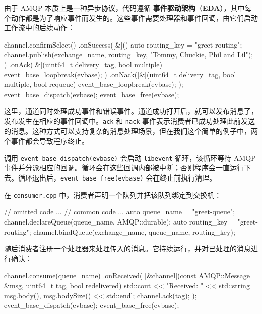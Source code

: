 \label{idx:1564}
\label{idx:1565}
\label{idx:1566}
\label{idx:1567}
由于 AMQP 本质上是一种异步协议，代码遵循 \textbf{事件驱动架构}（\textbf{EDA}），其中每个动作都是为了响应事件而发生的。这些事件需要处理器和事件回调，由它们启动工作流中的后续动作：

\begin{codebox}[text]
channel.confirmSelect()
    .onSuccess([&]() {
      auto routing_key = "greet-routing";
      channel.publish(exchange_name, routing_key,
                      "Tommy, Chuckie, Phil and Lil");
    })
    .onAck([&](uint64_t delivery_tag, bool multiple) {
      event_base_loopbreak(evbase);
    })
    .onNack([&](uint64_t delivery_tag, bool multiple, bool requeue) {
      event_base_loopbreak(evbase);
    });
event_base_dispatch(evbase);
event_base_free(evbase);
\end{codebox}

这里，通道同时处理成功事件和错误事件。通道成功打开后，就可以发布消息了，发布发生在相应的事件回调中。\texttt{ack} 和 \texttt{nack} 事件表示消费者已成功处理此前发送的消息。这种方式可以支持复杂的消息处理场景，但在我们这个简单的例子中，两个事件都会导致程序终止。

调用 \texttt{event\_\allowbreak{}base\_\allowbreak{}dispatch(\allowbreak{}evbase)\allowbreak{}} 会启动 \texttt{libevent} 循环，该循环等待 AMQP 事件并分派相应的回调。循环会在这些回调内部被中断；否则程序会一直运行下去。循环退出后，\texttt{event\_\allowbreak{}base\_\allowbreak{}free(\allowbreak{}evbase)\allowbreak{}} 会在终止前执行清理。

在 \texttt{consumer.\allowbreak{}cpp} 中，消费者声明一个队列并把该队列绑定到交换机：

\begin{codebox}[text]
// omitted code
...
// common code
...
auto queue_name = "greet-queue";
channel.declareQueue(queue_name, AMQP::durable);
auto routing_key = "greet-routing";
channel.bindQueue(exchange_name, queue_name, routing_key);
\end{codebox}

\label{idx:1568}
\label{idx:1569}
\label{idx:1570}
随后消费者注册一个处理器来处理传入的消息。它持续运行，并对已处理的消息进行确认：

\begin{codebox}[cpp]
channel.consume(queue_name)
    .onReceived(
        [&channel](const AMQP::Message &msg, uint64_t tag, bool 
                   redelivered) {
                                std::cout << "Received: " << std::string{
                                msg.body(), msg.bodySize()
                                }
                   << std::endl;
         channel.ack(tag);
        });
event_base_dispatch(evbase);
event_base_free(evbase);
\end{codebox}

